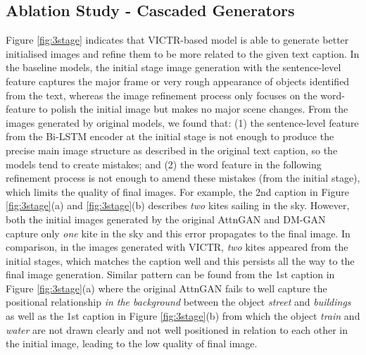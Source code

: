 \documentclass[11pt]{article}
\begin{document}
\subsection{Ablation Study - Cascaded Generators}

Figure \ref{fig:3stage} indicates that VICTR-based model is able to generate better initialised images and refine them to be more related to the given text caption. In the baseline models, the initial stage image generation with the sentence-level feature captures the major frame or very rough appearance of objects identified from the text, whereas the image refinement process only focuses on the word-feature to polish the initial image but makes no major scene changes. From the images generated by original models, we found that: (1) the sentence-level feature from the Bi-LSTM encoder at the initial stage is not enough to produce the precise main image structure as described in the original text caption, so the models tend to create mistakes; and (2) the word feature in the following refinement process is not enough to amend these mistakes (from the initial stage), which limits the quality of final images. For example, the 2nd caption in Figure \ref{fig:3stage}(a) and \ref{fig:3stage}(b) describes \textit{two} kites sailing in the sky. However, both the initial images generated by the original AttnGAN and DM-GAN capture only \textit{one} kite in the sky and this error propagates to the final image. In comparison, in the images generated with VICTR, \textit{two} kites appeared from the initial stages, which matches the caption well and this persists all the way to the final image generation. Similar pattern can be found from the 1st caption in Figure \ref{fig:3stage}(a) where the original AttnGAN fails to well capture the positional relationship \textit{in the background} between the object \textit{street} and \textit{buildings} as well as the 1st caption in Figure \ref{fig:3stage}(b) from which the object \textit{train} and \textit{water} are not drawn clearly and not well positioned in relation to each other in the initial image, leading to the low quality of final image.
\end{document}
